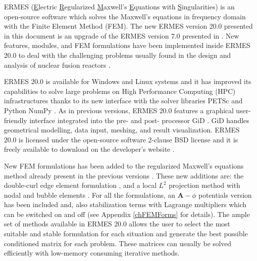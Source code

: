 %
%

ERMES (\underline{E}lectric \underline{R}egularized \underline{M}axwell's \underline{E}quations with \underline{S}ingularities) is an open-source software which solves the Maxwell's equations in frequency domain with the Finite Element Method (FEM). The new ERMES version 20.0 presented in this document is an upgrade of the ERMES version 7.0 presented in \cite{ERMES-CPC}. New features, modules, and FEM formulations have been implemented inside ERMES 20.0 to deal with the challenging problems usually found in the design and analysis of nuclear fusion reactors \cite{NAFEMS-CEM}. 

ERMES 20.0 is available for Windows and Linux systems and it has improved its capabilities to solve large problems on High Performance Computing (HPC) infrastructures thanks to its new interface with the solver libraries PETSc \cite{PETScWeb} and Python NumPy \cite{NumPyWeb}. As in previous versions, ERMES 20.0 features a graphical user-friendly interface integrated into the pre- and post- processor GiD \cite{GiDWeb}. GiD handles geometrical modelling, data input, meshing, and result visualization. ERMES 20.0 is licensed under the open-source software 2-clause BSD license and it is freely available to download on the developer's website \cite{ROtinWeb}.

New FEM formulations has been added to the regularized Maxwell's equations method already present in the previous versions \cite{EMPaper-Me, WRME-Performance}. These new additions are: the double-curl edge element formulation \cite{Jin}, and a local $L^{2}$ projection method with nodal and bubble elements \cite{L2P-BE}. For all the formulations, an $\textbf{A}-\phi$ potentials version has been included and, also stabilization terms with Lagrange multipliers which can be switched on and off (see Appendix \ref{chFEMForms} for details). The ample set of methods available in ERMES 20.0 allows the user to select the most suitable and stable formulation for each situation and generate the best possible conditioned matrix for each problem. These matrices can usually be solved efficiently with low-memory consuming iterative methods. 

